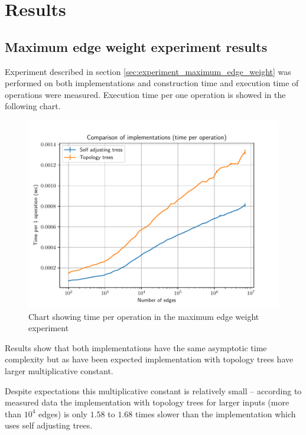 \chapter{Results}
\label{chap:Results}

\section{Maximum edge weight experiment results}
\label{sec:results_maximum_edge_weight}

Experiment described in section \ref{sec:experiment_maximum_edge_weight} was
performed on both implementations and construction time and execution time of
operations were measured. Execution time per one operation is showed in the
following chart.

\begin{figure}[H]
\centering
{}\hsize
\includegraphics[width=\hsize]{charts/maximum_edge_weight_op.pdf}
\caption{Chart showing time per operation in the maximum edge weight experiment}
\end{figure}

Results show that both implementations have the same asymptotic time complexity
but as have been expected implementation with topology trees have larger
multiplicative constant.

Despite expectations this multiplicative constant is relatively small --
according to measured data the implementation with topology trees for larger
inputs (more than $10^4$ edges) is only $1.58$ to $1.68$ times slower than the
implementation which uses self adjusting trees.

